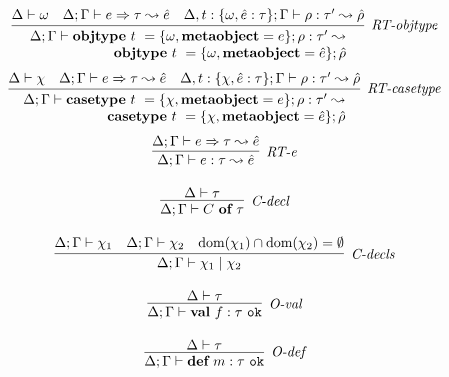 \begin{figure}
\centering
\[
\begin{array}{c}

\infer[\textit{RT-objtype}]
          {\renewcommand{\arraystretch}{1}
	    \begin{array}{r}
	    \Delta; \Gamma \vdash  \keyw{objtype}~ t~=\{{\omega}, \keyw{metaobject}=e\}; \rho: \tau'\leadsto\\
            \keyw{objtype}~ t~=\{{\omega}, \keyw{metaobject}=\hat{e}\}; \hat{\rho}
            \end{array}
       }
	  {\Delta \vdash \omega & \Delta; \Gamma \vdash e \Rightarrow \tau \leadsto \hat{e} & \Delta, t:\{\omega, \hat e:\tau\}; \Gamma \vdash \rho :\tau'\leadsto \hat{\rho} }
	   \\[3ex] 


\infer[\textit{RT-casetype}]
          {\renewcommand{\arraystretch}{1}
	    \begin{array}{r}
	    \Delta; \Gamma \vdash  \keyw{casetype}~ t~=\{\chi, \keyw{metaobject}=e\}; \rho :\tau' \leadsto \\
            \keyw{casetype}~ t~=\{\chi, \keyw{metaobject}=\hat{e}\};\hat{\rho}
            \end{array}
       }
	  {\Delta \vdash \chi & \Delta; \Gamma \vdash e \Rightarrow \tau \leadsto \hat{e} & \Delta, t:\{\chi, \hat e:\tau\}; \Gamma \vdash \rho :\tau'\leadsto \hat{\rho} }
	   \\[3ex] 


\infer[\textit{RT-e}]
	{\Delta; \Gamma \vdash  e:\tau \leadsto \hat{e}} 
	{\Delta; \Gamma \vdash e \Rightarrow \tau \leadsto \hat{e}}\\[3ex]

\infer[\textit{C-decl}]
	{\Delta; \Gamma \vdash  C~\keyw{of}~\tau} 
	{\Delta \vdash \tau   }\\[3ex]

\infer[\textit{C-decls}]
	{\Delta; \Gamma \vdash  \chi_1 \bnfalt \chi_2} 
	{\Delta; \Gamma \vdash \chi_1 & \Delta; \Gamma \vdash \chi_2 & \text{dom}(\chi_1) \intersect \text{dom}(\chi_2) = \emptyset}\\[3ex]

\infer[\textit{O-val}]
	{\Delta; \Gamma \vdash \keyw{val}~ f:\tau \ \texttt{ok} }
	{\Delta \vdash \tau} \\[3ex]
	
\infer[\textit{O-def}]
	{\Delta; \Gamma \vdash \keyw{def}~ m:\tau \ \texttt{ok} }
	{\Delta \vdash \tau } \\[3ex]


\end{array}\]
\end{figure}
